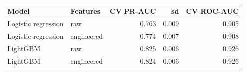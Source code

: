 \begin{tabular}{llrrr}
\toprule
Model & Features & CV PR-AUC & sd & CV ROC-AUC \\
\midrule
Logistic regression & raw & 0.763 & 0.009 & 0.905 \\
Logistic regression & engineered & 0.774 & 0.007 & 0.908 \\
LightGBM & raw & 0.825 & 0.006 & 0.926 \\
LightGBM & engineered & 0.824 & 0.006 & 0.926 \\
\bottomrule
\end{tabular}

